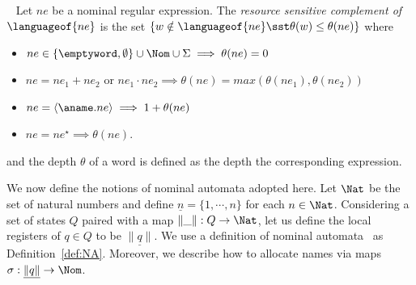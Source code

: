 \begin{definition}~\cite{Kurz0T2012}\label{def:rsComplementation} Let
  $ne$ be a nominal regular expression.
  The \emph{resource sensitive complement of $\languageof{ne}$} is the
  set $\{w \notin \languageof{ne} \sst \theta(w) \leq \theta(ne)\}$
  where
  \begin{itemize}
  \item
    $ne \in \{\emptyword,\emptyset\} \cup \Nom \cup \Sigma \implies
    \theta(ne) =0$
  \item $ne=ne_1+ne_2$ or
    $ne_1\cdot ne_2 \implies \theta(ne) =max(\theta(ne_1) , \theta(ne_2) )$
  \item $ne = \langle \aname. ne \rangle \implies 1 + \theta(ne)$
  \item $ne= ne^\star \implies \theta(ne) $.
  \end{itemize}
  and the depth $\theta$ of a word is defined as the depth the corresponding
  expression.
\end{definition}

We now define the notions of nominal automata adopted here. Let
$\Nat$ be the set of natural numbers and define
$\underline{n}=\{1,\cdots,n\}$ for each $n\in \Nat$. Considering
a set of states $Q$ paired with a map $\|\_\|: Q\rightarrow \Nat$,
let us define the local registers of $q\in Q$ to be
$\underline{\|q\|}$. We use a definition of nominal
automata~\cite{Kurz0T12} as Definition~\ref{def:NA}. Moreover, we
describe how to allocate names via maps
$\sigma:\underline{\|q\|}\rightarrow \Nom$.

